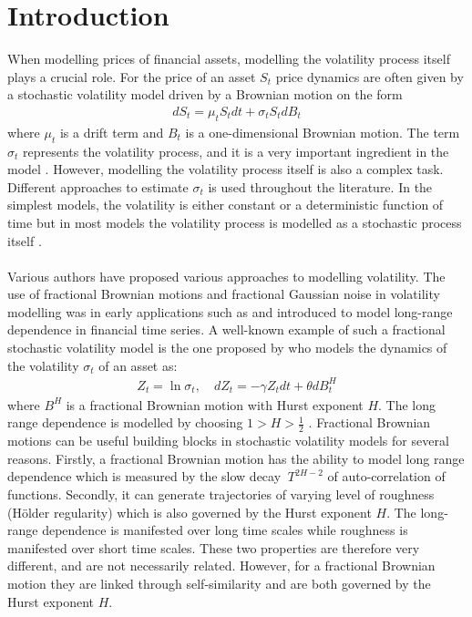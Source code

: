 \documentclass{article}
\begin{document}
\tableofcontents
\newpage
{}
\section{Introduction}
When modelling prices of financial assets, modelling the volatility process itself plays a crucial role. For the price of an asset $S_t$ price dynamics are often given by a stochastic volatility model driven by a Brownian motion on the form
\begin{align}
dS_t = \mu_tS_t dt+\sigma_tS_t dB_t \label{eq:price_gen}
\end{align}
where $\mu_t$ is a drift term and $B_t$ is a one-dimensional Brownian motion. The term $\sigma_t$ represents the volatility process, and it is a very important ingredient in the model . However, modelling the volatility process itself is also a complex task. Different approaches to estimate $\sigma_t$ is used throughout the literature. In the simplest models, the volatility is either constant or a deterministic function of time but in most models the volatility process is modelled as a stochastic process itself \cite{gatheral}. \\\\
Various authors have proposed various approaches to modelling volatility. The use of fractional Brownian motions and fractional Gaussian noise in volatility modelling was in early applications such as \cite{Bollerslev} and \cite{comte} introduced to model long-range dependence in financial time series. A well-known example of such a fractional stochastic volatility model is the one proposed by \cite{comte} who models the dynamics of the volatility $\sigma_t$ of an asset as:
\begin{align*}
Z_t = \ln\sigma_t, \quad dZ_t = -\gamma Z_t dt+\theta dB^H_t
\end{align*}
where $B^H$ is a fractional Brownian motion with Hurst exponent $H$. The long range dependence is modelled by choosing $1>H>\frac{1}{2}$ \cite{comte}. Fractional Brownian motions can be useful building blocks in stochastic volatility models for several reasons. Firstly, a fractional Brownian motion has the ability to model long range dependence which is measured by the slow decay $~T^{2H-2}$ of auto-correlation of functions. Secondly, it can generate trajectories of varying level of roughness (Hölder regularity) which is also governed by the Hurst exponent $H$. The long-range dependence is manifested over long time scales while roughness is manifested over short time scales. These two properties are therefore very different, and are not necessarily related. However, for a fractional Brownian motion they are linked through self-similarity and are both governed by the Hurst exponent $H$.\\\\
\end{document}
